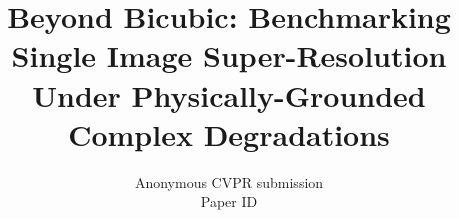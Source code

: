 \documentclass[10pt,twocolumn,letterpaper]{article}
\title{Beyond Bicubic: Benchmarking Single Image Super-Resolution Under Physically-Grounded Complex Degradations}
\author{Anonymous CVPR submission\\
Paper ID \paperID}
\begin{document}
\maketitle








\FloatBarrier
{
    \small
    
    
}
\end{document}
